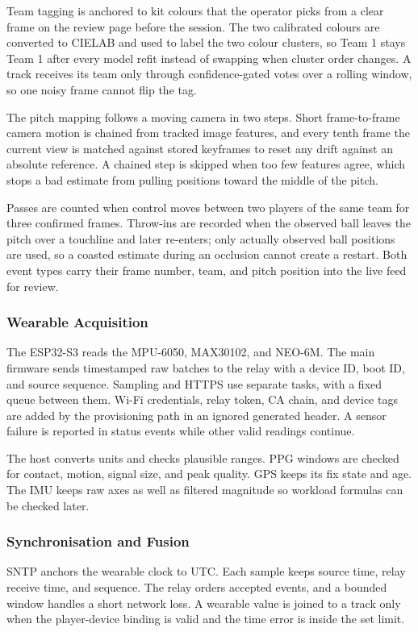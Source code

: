 Team tagging is anchored to kit colours that the operator picks from a clear
frame on the review page before the session. The two calibrated colours are
converted to CIELAB and used to label the two colour clusters, so Team 1 stays
Team 1 after every model refit instead of swapping when cluster order changes.
A track receives its team only through confidence-gated votes over a rolling
window, so one noisy frame cannot flip the tag.

The pitch mapping follows a moving camera in two steps. Short frame-to-frame
camera motion is chained from tracked image features, and every tenth frame the
current view is matched against stored keyframes to reset any drift against an
absolute reference. A chained step is skipped when too few features agree, which
stops a bad estimate from pulling positions toward the middle of the pitch.

Passes are counted when control moves between two players of the same team for
three confirmed frames. Throw-ins are recorded when the observed ball leaves the
pitch over a touchline and later re-enters; only actually observed ball positions
are used, so a coasted estimate during an occlusion cannot create a restart.
Both event types carry their frame number, team, and pitch position into the
live feed for review.

\subsubsection{Wearable Acquisition}
The ESP32-S3 reads the MPU-6050, MAX30102, and NEO-6M. The main firmware sends
timestamped raw batches to the relay with a device ID, boot ID, and source
sequence. Sampling and HTTPS use separate tasks, with a fixed queue between
them. Wi-Fi credentials, relay token, CA chain, and device tags are added by the
provisioning path in an ignored generated header. A sensor failure is reported
in status events while other valid readings continue.

The host converts units and checks plausible ranges. PPG windows are checked
for contact, motion, signal size, and peak quality. GPS keeps its fix state and
age. The IMU keeps raw axes as well as filtered magnitude so workload formulas
can be checked later.

\subsubsection{Synchronisation and Fusion}
SNTP anchors the wearable clock to UTC. Each sample keeps source time, relay
receive time, and sequence. The relay orders accepted events, and a bounded
window handles a short network loss. A wearable value is joined to a track only
when the player-device binding is valid and the time error is inside the set
limit.

